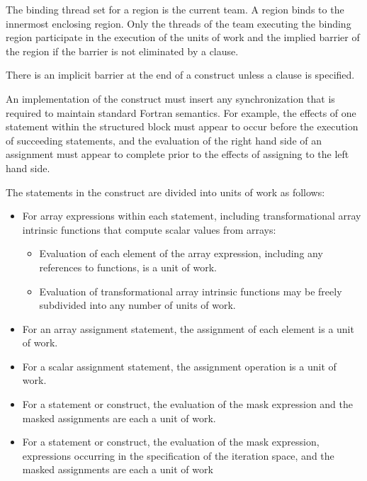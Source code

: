 \begin{fortranspecific}
\binding
The binding thread set for a  region is the current team. A 
region binds to the innermost enclosing  region. Only the threads of the team
executing the binding  region participate in the execution of the units of
work and the implied barrier of the  region if the barrier is not eliminated
by a  clause.

\descr
There is an implicit barrier at the end of a  construct unless a 
clause is specified.

An implementation of the  construct must insert any synchronization that is
required to maintain standard Fortran semantics. For example, the effects of one
statement within the structured block must appear to occur before the execution of
succeeding statements, and the evaluation of the right hand side of an assignment must
appear to complete prior to the effects of assigning to the left hand side.

The statements in the  construct are divided into units of work as follows:

\begin{itemize}
\item For array expressions within each statement, including transformational array
intrinsic functions that compute scalar values from arrays:

\begin{itemize} %
\item Evaluation of each element of the array expression, including any references to
 functions, is a unit of work.

\item Evaluation of transformational array intrinsic functions may be freely subdivided
into any number of units of work.
\end{itemize}

\item For an array assignment statement, the assignment of each element is a unit of work.

\item For a scalar assignment statement, the assignment operation is a unit of work.

\item For a  statement or construct, the evaluation of the mask expression and the
masked assignments are each a unit of work.

\item For a  statement or construct, the evaluation of the mask expression,
expressions occurring in the specification of the iteration space, and the masked
assignments are each a unit of work


\end{itemize}
\end{fortranspecific}
